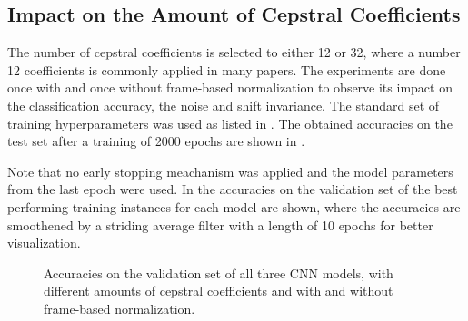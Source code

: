 
\subsection{Impact on the Amount of Cepstral Coefficients}
The number of cepstral coefficients is selected to either 12 or 32, where a number 12 coefficients is commonly applied in many papers.
The experiments are done once with and once without frame-based normalization to observe its impact on the classification accuracy, the noise and shift invariance.
The standard set of training hyperparameters was used as listed in .
The obtained accuracies on the test set after a training of 2000 epochs are shown in .

Note that no early stopping meachanism was applied and the model parameters from the last epoch were used.
In  the accuracies on the validation set of the best performing training instances for each model are shown, where the accuracies are smoothened by a striding average filter with a length of 10 epochs for better visualization.
\begin{figure}[!ht]
  \centering
  \caption{Accuracies on the validation set of all three CNN models, with different amounts of cepstral coefficients and with and without frame-based normalization.}
  \label{fig:exp_fs_cepstral_acc}
\end{figure}
\FloatBarrier
\noindent

